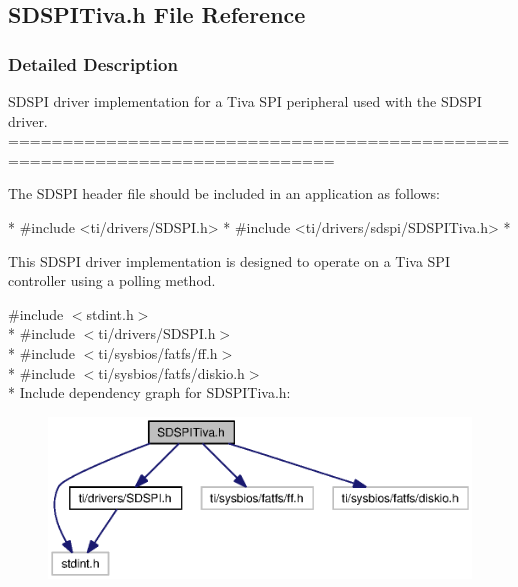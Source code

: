 \subsection{S\-D\-S\-P\-I\-Tiva.\-h File Reference}
\label{_s_d_s_p_i_tiva_8h}


\subsubsection{Detailed Description}
S\-D\-S\-P\-I driver implementation for a Tiva S\-P\-I peripheral used with the S\-D\-S\-P\-I driver. ============================================================================

The S\-D\-S\-P\-I header file should be included in an application as follows\-: 
\begin{DoxyCode}
*  #include <ti/drivers/SDSPI.h>
*  #include <ti/drivers/sdspi/SDSPITiva.h>
*  
\end{DoxyCode}


This S\-D\-S\-P\-I driver implementation is designed to operate on a Tiva S\-P\-I controller using a polling method. 

{\ttfamily \#include $<$stdint.\-h$>$}\\*
{\ttfamily \#include $<$ti/drivers/\-S\-D\-S\-P\-I.\-h$>$}\\*
{\ttfamily \#include $<$ti/sysbios/fatfs/ff.\-h$>$}\\*
{\ttfamily \#include $<$ti/sysbios/fatfs/diskio.\-h$>$}\\*
Include dependency graph for S\-D\-S\-P\-I\-Tiva.\-h\-:
\nopagebreak
\begin{figure}[H]
\begin{center}
\leavevmode
\includegraphics[width=350pt]{_s_d_s_p_i_tiva_8h__incl}
\end{center}
\end{figure}
